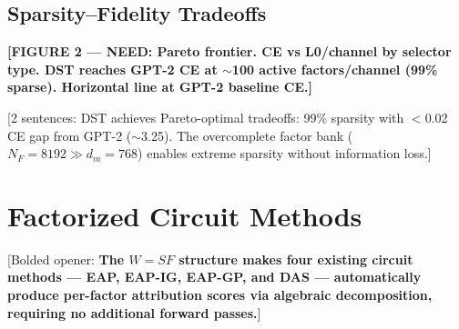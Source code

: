 \documentclass[11pt]{article}
\begin{document}

\subsection{Sparsity--Fidelity Tradeoffs}

\textbf{[FIGURE 2 --- NEED: Pareto frontier. CE vs L0/channel by selector
type. DST reaches GPT-2 CE at $\sim$100 active factors/channel (99\% sparse).
Horizontal line at GPT-2 baseline CE.]}

[2 sentences: DST achieves Pareto-optimal tradeoffs: 99\% sparsity
with $<$0.02 CE gap from GPT-2 ($\sim$3.25). The overcomplete factor bank
($N_F = 8192 \gg d_m = 768$) enables extreme sparsity without
information loss.]



\section{Factorized Circuit Methods}
\label{sec:factorized_methods}

%

[Bolded opener: \textbf{The $W = SF$ structure makes four existing
circuit methods --- EAP, EAP-IG, EAP-GP, and DAS --- automatically
produce per-factor attribution scores via algebraic decomposition,
requiring no additional forward passes.}]
\end{document}
